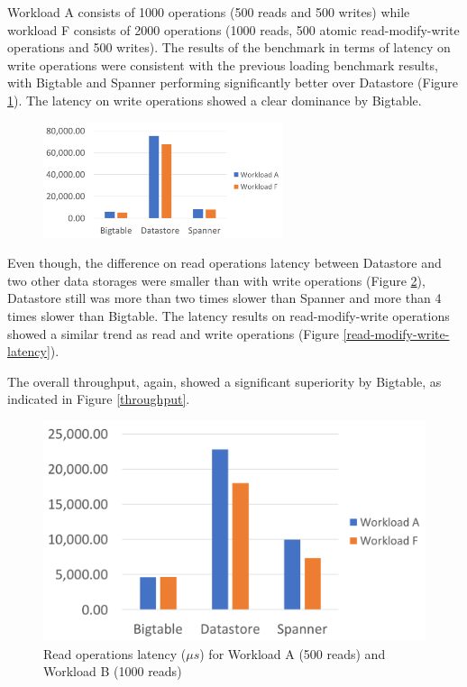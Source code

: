 \documentclass[bsc,frontabs,twoside,singlespacing,parskip,deptreport]{infthesis}     %
\begin{document}
Workload A consists of 1000 operations (500 reads and 500 writes) while workload F consists of 2000 operations (1000 reads, 500 atomic read-modify-write operations and 500 writes). The results of the benchmark in terms of latency on write operations were consistent with the previous loading benchmark results, with Bigtable and Spanner performing significantly better over Datastore (Figure \ref{write-latency}). The latency on write operations showed a clear dominance by Bigtable. 

\begin{figure}
	\centering
	\includegraphics[width=7cm]{write-latency}
	\caption{}
	\label{write-latency}
\end{figure}

Even though, the difference on read operations latency between Datastore and two other data storages were smaller than with write operations (Figure \ref{read-latency}), Datastore still was more than two times slower than Spanner and more than 4 times slower than Bigtable. The latency results on read-modify-write operations showed a similar trend as read and write operations (Figure \ref{read-modify-write-latency}). 

The overall throughput, again, showed a significant superiority by Bigtable, as indicated in Figure \ref{throughput}. 


\begin{figure}[ht]
	\centering
	\includegraphics[width=12cm]{read-latency}
	\caption{Read operations latency (\( \mu s\)) for Workload A (500 reads) and Workload B (1000 reads)}
	\label{read-latency}
\end{figure}
\end{document}
